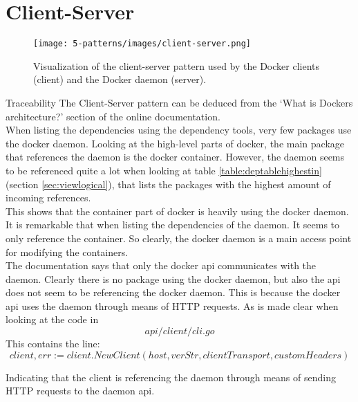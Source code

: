 \section{Client-Server}
\begin{figure}[H]
\centering
\texttt{[image: 5-patterns/images/client-server.png]}
\caption{Visualization of the client-server pattern used by the Docker clients (client) and the Docker daemon (server).}
\label{fig:clientserver-pattern}
\end{figure}

\begin{patdescription}
\item [Traceability] 
The Client-Server pattern can be deduced from the `What is Dockers architecture?' section of the online documentation\cite{dockerarchi}.\\
When listing the dependencies using the dependency tools, very few packages use the docker daemon. Looking at the high-level parts of docker, the main package that references the daemon is the docker container.
However, the daemon seems to be referenced quite a lot when looking at table \ref{table:deptablehighestin}(section \ref{sec:viewlogical}), that lists the packages with the highest amount of incoming references. \\
This shows that the container part of docker is heavily using the docker daemon.\\
It is remarkable that when listing the dependencies of the daemon. It seems to only reference the container. So clearly, the docker daemon is a main access point for modifying the containers.\\
The documentation says that only the docker api communicates with the daemon. Clearly there is no package using the docker daemon, but also the api does not seem to be referencing the docker daemon. This is because the docker api uses the daemon through means of HTTP requests. As is made clear when looking at the code in $$api/client/cli.go$$
This contains the line: 
$$client, err := client.NewClient(host, verStr, clientTransport, customHeaders)$$

Indicating that the client is referencing the daemon through means of sending HTTP requests to the daemon api.



\end{patdescription}
